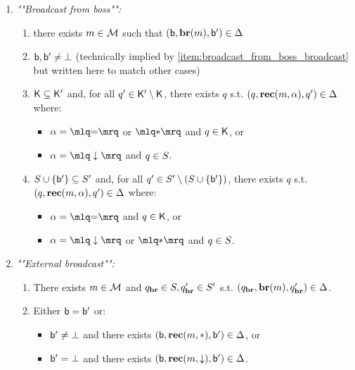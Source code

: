 \begin{definition}
\begin{enumerate}
		\item \emph{""Broadcast from boss"":}
		\begin{enumerate}[label = (\arabic*)]
			\item \label{item:broadcast_from_boss_broadcast} there exists $m \in \mathcal{M}$ such that $(\mathsf{b}, \textbf{br}(m), \mathsf{b}') \in \Delta$
			
			\item\label{item:broadcast_from_boss_boss} $\mathsf{b}, \mathsf{b}' \ne \bot$ (technically implied by \ref{item:broadcast_from_boss_broadcast} but written here to match other cases)
			
			\item\label{item:broadcast_from_boss_clique} 	$\mathsf{K} \subseteq \mathsf{K}'$ and, for all $q' \in \mathsf{K}' \setminus \mathsf{K}$, there exists $q$ s.t. $(q, \textbf{rec}(m, \alpha), q') \in \Delta$ where:
			\begin{itemize}
				\item $\anact = \quotemarks{\eqtestact}$ or $\quotemarks{\dummyact}$ and $q \in \mathsf{K}$, or
				\item $\anact= \quotemarks{\enregact}$ and $q \in S$.
			\end{itemize}
			
			\item\label{item:broadcast_from_boss_covset} $S \cup \{\mathsf{b}'\} \subseteq S'$ and, for all $q' \in S' \setminus (S \cup \{\mathsf{b}'\})$, there exists $q$ s.t. $(q, \textbf{rec}(m, \alpha), q') \in \Delta$ where:
			\begin{itemize}
				\item  $\anact = \quotemarks{\eqtestact}$ and $q \in \mathsf{K}$, or
				\item $\anact = \quotemarks{\enregact}$ or $\quotemarks{\dummyact}$ and $q \in S$.
			\end{itemize}
		\end{enumerate}
		
		
		\item \emph{""External broadcast"":}
		\begin{enumerate}[label = (\arabic*)]
			\item\label{item:external_broadcast_broadcast} There exists $m \in \mathcal{M}$ and $q_{\textbf{br}} \in S, q_{\textbf{br}}' \in S'$ s.t. $(q_{\textbf{br}}, \textbf{br}(m), q_{\textbf{br}}') \in \Delta$. 
			
			\item\label{item:external_broadcast_boss}Either $\mathsf{b} = \mathsf{b}'$ or:
			\begin{itemize} 
				\item $\mathsf{b}' \ne \bot$ and there exists $(\mathsf{b}, \textbf{rec}(m, {*}), \mathsf{b}') \in \Delta$, or
				\item $\mathsf{b}' = \bot$ and there exists $(\mathsf{b}, \textbf{rec}(m, \downarrow), \mathsf{b}') \in \Delta$.
			\end{itemize}
			

\end{enumerate}
\end{enumerate}
\end{definition}
